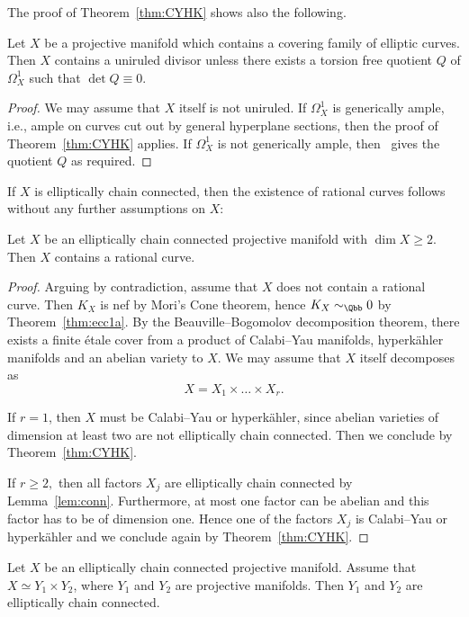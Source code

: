 The proof of Theorem~\ref{thm:CYHK} shows also the following.

\begin{theo}\label{theo:main6.7}
Let $X$ be a projective manifold which contains a covering family of elliptic curves. Then $X$ contains a uniruled divisor unless there exists a torsion free quotient $Q$ of $ \Omega^1_X $ such that $\det Q \equiv 0$.
\end{theo}

\begin{proof}
We may assume that $X$ itself is not uniruled. If $\Omega^1_X $ is generically ample, i.e., ample on curves cut out by general hyperplane sections, then the proof of Theorem~\ref{thm:CYHK} applies. If $\Omega^1_X $ is not generically ample, then~\cite[Proposition~2]{Pe11} gives the quotient $Q$ as required.
\end{proof}

If $X$ is elliptically chain connected, then the existence of rational curves follows without any further assumptions on $X$:

\begin{theo}\label{thm:ellipticrational}
Let $X$ be an elliptically chain connected projective manifold with $\dim X \geq 2$. Then $X$ contains a rational curve.
\end{theo}

\begin{proof}
Arguing by contradiction, assume that $X$ does not contain a rational curve. Then $K_X$ is nef by Mori's Cone theorem, hence $K_X \sim_\Qbb0$ by Theorem~\ref{thm:ecc1a}. By the Beauville--Bogomolov decomposition theorem, there exists a finite étale cover from a product of Calabi--Yau manifolds, hyperkähler manifolds and an abelian variety to $X$. We may assume that $X$ itself decomposes as
\[
X = X_1 \times \ldots \times X_r.
\]

If $r = 1$, then $X$ must be Calabi--Yau or hyperkähler, since abelian varieties of dimension at least two are not elliptically chain connected. Then we conclude by Theorem~\ref{thm:CYHK}.

If $r \geq 2,$ then all factors $X_j$ are elliptically chain connected by Lemma~\ref{lem:conn}. Furthermore, at most one factor can be abelian and this factor has to be of dimension one. Hence one of the factors $X_j$ is Calabi--Yau or hyperkähler and we conclude again by Theorem~\ref{thm:CYHK}.
\end{proof}

\begin{lemm}\label{lem:conn}
Let $X$ be an elliptically chain connected projective manifold. Assume that $X \simeq Y_1 \times Y_2$, where $Y_1$ and $Y_2$ are projective manifolds. Then $Y_1$ and $Y_2$ are elliptically chain connected.
\end{lemm}

